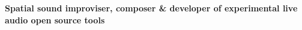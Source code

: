 \documentclass[10pt,a4paper]{article}
\begin{document}
\vspace{0.7em}
\spacedhrule{0.9em}{-0.4em}  %


\noindent \textbf{Spatial sound improviser, composer \& developer of experimental live audio open source tools}
\nobreakvspace{1em}





\end{document}
